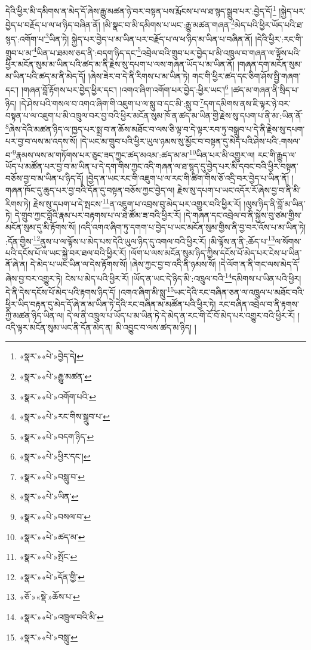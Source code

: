 དེའི་ཕྱིར་མི་དམིགས་ན་མེད་དོ་ཞེས་རྒྱུ་མཚན་ཉེ་བར་བསྟན་པས་རྨོངས་པ་ལ་ཐ་སྙད་སྒྲུབ་པར་:བྱེད་དོ།\footnote{«སྣར་»«པེ་»བྱེད་དེ།} །སྐྱེད་པར་བྱེད་པ་བརྗོད་པ་ལ་ཕ་ཉིད་བཞིན་ནོ། །མི་སྣང་བ་མི་དམིགས་པ་ཡང་:རྒྱུ་མཚན་གཞན་\footnote{«སྣར་»«པེ་»རྒྱུ་མཚན་}མེད་པའི་ཕྱིར་ཡོད་པའི་ཐ་སྙད་:འགོག་པ་\footnote{«སྣར་»«པེ་»འགོག་པའི་}ཡིན་ཏེ། སྐྱེད་པར་བྱེད་པ་མ་ཡིན་པར་བརྗོད་པ་ལ་ཕ་ཉིད་མ་ཡིན་པ་བཞིན་ནོ། །དེའི་ཕྱིར་:རང་གི་གྲུབ་པ་མ་\footnote{«སྣར་»«པེ་»རང་གིས་སྒྲུབ་པ་}ཡིན་པ་ཐམས་ཅད་ནི་:བདག་ཉིད་དང་\footnote{«སྣར་»«པེ་»བདག་ཉིད་}འབྲེལ་བའི་གྲུབ་པར་བྱེད་པ་མི་འཁྲུལ་བ་གཞན་ལ་ལྟོས་པའི་ཕྱིར་མངོན་སུམ་མ་ཡིན་པའི་ཚད་མ་ནི་རྗེས་སུ་དཔག་པ་ལས་གཞན་ཡོད་པ་མ་ཡིན་ནོ། །གཞན་དག་མངོན་སུམ་མ་ཡིན་པའི་ཚད་མ་ནི་མེད་དོ། །ཞེས་ཟེར་བ་དེ་ནི་རིགས་པ་མ་ཡིན་ཏེ། གང་གི་ཕྱིར་ཚད་དང་ཅིག་ཤོས་སྤྱི་གཞག་དང་། །གཞན་བློ་རྟོགས་པར་བྱེད་ཕྱིར་དང་། །འགའ་ཞིག་འགོག་པར་བྱེད་:ཕྱིར་ཡང་།\footnote{«སྣར་»«པེ་»ཕྱིར་དང་།} །ཚད་མ་གཞན་ནི་སྲིད་པ་ཉིད། །དེ་ཤེས་པའི་གསལ་བ་འགའ་ཞིག་གི་འཇུག་པ་ལ་སླུ་བ་དང་མི་:སླུ་བ་\footnote{«སྣར་»«པེ་»བསླུ་བ་}དག་དམིགས་ནས་ཇི་ལྟར་ཉེ་བར་བསྟན་པ་ལ་འཇུག་པ་མི་འཁྲུལ་བར་བྱ་བའི་ཕྱིར་མངོན་སུམ་ཁོ་ན་ཚད་མ་ཡིན་གྱི་རྗེས་སུ་དཔག་པ་ནི་མ་:ཡིན་ནོ་\footnote{«སྣར་»«པེ་»ཡིན་}ཞེས་དེའི་མཚན་ཉིད་ལ་ཁྱད་པར་སྨྲ་བ་ན་ཆོས་མཐོང་བ་ལས་ཅི་ལྟ་བ་དེ་ལྟར་རབ་ཏུ་བསྒྲུབ་པ་དེ་ནི་རྗེས་སུ་དཔག་པར་བྱ་བ་ལས་མ་འདས་སོ། །དེ་ཡང་མ་གྲུབ་པའི་ཕྱིར་ཡུལ་ཉམས་སུ་མྱོང་བ་བསྟན་དུ་མེད་པའི་ཤེས་པའི་:གསལ་བ་\footnote{«སྣར་»«པེ་»བསལ་བ་}རྣམས་ལས་མ་གཏོགས་པར་ཅུང་ཟད་ཀྱང་ཚད་མའམ་:ཚད་མ་མ་\footnote{«སྣར་»«པེ་»ཚད་མ་}ཡིན་པར་མི་འགྱུར་ལ། རང་གི་རྒྱུད་ལ་ཡོད་པ་མཚོན་པར་བྱ་བ་མ་ཡིན་པ་དེ་དག་གིས་ཀྱང་འདི་གཞན་ལ་ཐ་སྙད་དུ་བྱེད་པར་མི་དབང་བའི་ཕྱིར་བསྟན་བཅོས་བྱ་བ་མ་ཡིན་པ་ཉིད་དོ། །བྱེད་ན་ཡང་རང་གི་འཇུག་པ་ལ་རང་གི་ཚིག་གིས་ཅོ་འདྲི་བར་བྱེད་པ་ཡིན་ནོ། །གཞན་ཁོང་དུ་ཆུད་པར་བྱ་བའི་དོན་དུ་བསྟན་བཅོས་ཀྱང་བྱེད་ལ། རྗེས་སུ་དཔག་པ་ཡང་འདོར་རོ་ཞེས་བྱ་བ་ནི་མི་རིགས་ཏེ། རྗེས་སུ་དཔག་པ་དེ་སྤངས་\footnote{«སྣར་»«པེ་»སྤོང་}ན་འཇུག་པ་འབྲས་བུ་མེད་པར་འགྱུར་བའི་ཕྱིར་རོ། །ལུས་ཉིད་ནི་བློ་མ་ཡིན་ཏེ། དེ་གྲུབ་ཀྱང་བློའི་རྣམ་པར་བརྟགས་པ་ལ་ཐེ་ཚོམ་ཟ་བའི་ཕྱིར་རོ། །དེ་གཞན་དང་འབྲེལ་བ་ནི་སྐྱེས་བུ་ཙམ་གྱིས་མངོན་སུམ་དུ་མི་རྟོགས་སོ། །འདི་འགའ་ཞིག་ཏུ་དགག་པ་བྱེད་པ་ཡང་མངོན་སུམ་གྱིས་ནི་བྱ་བར་འོས་པ་མ་ཡིན་ཏེ། :དོན་གྱིས་\footnote{«སྣར་»«པེ་»དོན་གྱི་}ནུས་པ་ལ་ལྟོས་པ་མེད་པས་དེའི་ཡུལ་ཉིད་དུ་འགལ་བའི་ཕྱིར་རོ། །མི་ལྟོས་ན་ནི་:ཆོད་པ་\footnote{«ཅོ་»«སྡེ་»ཆོས་པ་}ལ་སོགས་པའི་དངོས་པོ་ལ་ཡང་སྐྱེ་བར་ཐལ་བའི་ཕྱིར་རོ། །ལོག་པ་ལས་མངོན་སུམ་ཉིད་ཀྱིས་དངོས་པོ་མེད་པར་ངེས་པ་ཡིན་ནོ་ཞེ་ན། དེ་མེད་པ་ཡང་ཡིན་ལ་དེས་རྟོགས་སོ། །ཞེས་ཀྱང་བྱ་བ་འདི་ནི་ཉམས་སོ། །དེ་ལོག་ན་ནི་གང་ལས་མེད་དོ་ཞེས་བྱ་བར་འགྱུར་ཏེ། ངེས་པ་མེད་པའི་ཕྱིར་རོ། །ཡོད་ན་ཡང་དེ་ཉིད་མི་:འཁྲུལ་བའི་\footnote{«སྣར་»«པེ་»འཁྲུལ་བའི་མི་}དམིགས་པ་ཡིན་པའི་ཕྱིར། དེ་ནི་དེས་དངོས་པོ་མེད་པའི་རྟགས་ཉིད་དོ། །འགའ་ཞིག་མི་སླུ་\footnote{«སྣར་»«པེ་»བསླུ་}ཡང་དེའི་རང་བཞིན་ཅན་ལ་འཁྲུལ་པ་མཐོང་བའི་ཕྱིར་ཡིད་བརྟན་དུ་མེད་དོ་ཞེ་ན་མ་ཡིན་ཏེ་དེའི་རང་བཞིན་མ་མཚོན་པའི་ཕྱིར་ཏེ། རང་བཞིན་འབྲེལ་བ་ནི་རྟགས་ཀྱི་མཚན་ཉིད་ཡིན་ལ། དེ་ལ་ནི་འཁྲུལ་པ་ཡོད་པ་མ་ཡིན་ཏེ་དེ་མེད་ན་རང་གི་ངོ་བོ་མེད་པར་འགྱུར་བའི་ཕྱིར་རོ། །འདི་ལྟར་མངོན་སུམ་ཡང་ནི་དོན་མེད་ན། མི་འབྱུང་བ་ལས་ཚད་མ་ཉིད། །
